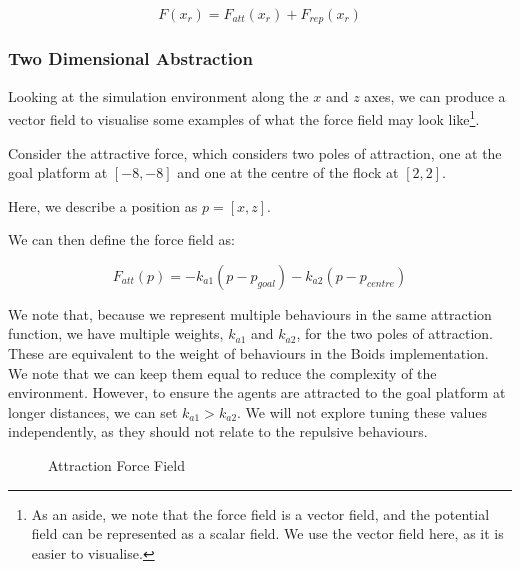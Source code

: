 \documentclass[12pt]{article}
\begin{document}
\begin{equation}
    F(x_r) = F_{att}(x_r) + F_{rep}(x_r)
\end{equation}

\subsubsection{Two Dimensional Abstraction}
Looking at the simulation environment along the $x$ and $z$ axes, we can produce a vector field to visualise some examples of what the force field may look like\footnote{As an aside, we note that the force field is a vector field, and the potential field can be represented as a scalar field. We use the vector field here, as it is easier to visualise.}.

Consider the attractive force, which considers two poles of attraction, one at the goal platform at $[-8,-8]$ and one at the centre of the flock at $[2,2]$. 

Here, we describe a position as $p = [x,z]$.

We can then define the force field as:

\begin{equation}
    F_{att}(p) = -k_{a1}(p-p_{goal}) - k_{a2}(p-p_{centre})
\end{equation}

We note that, because we represent multiple behaviours in the same attraction function, we have multiple weights, $k_{a1}$ and $k_{a2}$, for the two poles of attraction. These are equivalent to the weight of behaviours in the Boids implementation. We note that we can keep them equal to reduce the complexity of the environment. However, to ensure the agents are attracted to the goal platform at longer distances, we can set $k_{a1} > k_{a2}$. We will not explore tuning these values independently, as they should not relate to the repulsive behaviours.

\begin{figure}[ht]
    \centering
{}
    \caption{Attraction Force Field}
    \label{fig:force-field-att}
\end{figure}
\end{document}
